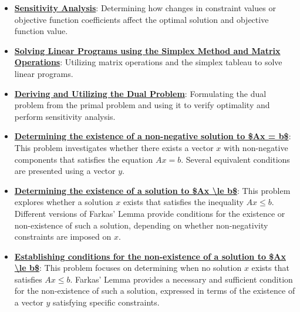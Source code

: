 \documentclass{article}%
\begin{document}
\begin{itemize}[leftmargin=*]%
\item \href{https://www.math.purdue.edu/~yipn/421/2024-10-01-SensitivityDuality.pdf#page=7}{\textbf{Sensitivity Analysis}}: Determining how changes in constraint values or objective function coefficients affect the optimal solution and objective function value.%
\item \href{https://www.math.purdue.edu/~yipn/421/2024-10-01-SensitivityDuality.pdf#page=4}{\textbf{Solving Linear Programs using the Simplex Method and Matrix Operations}}: Utilizing matrix operations and the simplex tableau to solve linear programs.%
\item \href{https://www.math.purdue.edu/~yipn/421/2024-10-01-SensitivityDuality.pdf#page=2}{\textbf{Deriving and Utilizing the Dual Problem}}: Formulating the dual problem from the primal problem and using it to verify optimality and perform sensitivity analysis.%
\end{itemize}%
\begin{itemize}[leftmargin=*]%
\item \href{https://www.math.purdue.edu/~yipn/421/2024-10-28-Farkas.pdf#page=2}{\textbf{Determining the existence of a non{-}negative solution to \$Ax = b\$}}: This problem investigates whether there exists a vector $x$ with non-negative components that satisfies the equation $Ax = b$. Several equivalent conditions are presented using a vector $y$.%
\item \href{https://www.math.purdue.edu/~yipn/421/2024-10-28-Farkas.pdf#page=4}{\textbf{Determining the existence of a solution to \$Ax \textbackslash{}le b\$}}: This problem explores whether a solution $x$ exists that satisfies the inequality $Ax \le b$. Different versions of Farkas' Lemma provide conditions for the existence or non-existence of such a solution, depending on whether non-negativity constraints are imposed on $x$.%
\item \href{https://www.math.purdue.edu/~yipn/421/2024-10-28-Farkas.pdf#page=6}{\textbf{Establishing conditions for the non{-}existence of a solution to \$Ax \textbackslash{}le b\$}}: This problem focuses on determining when no solution $x$ exists that satisfies $Ax \le b$. Farkas' Lemma provides a necessary and sufficient condition for the non-existence of such a solution, expressed in terms of the existence of a vector $y$ satisfying specific constraints.%
\end{itemize}%
\end{document}

